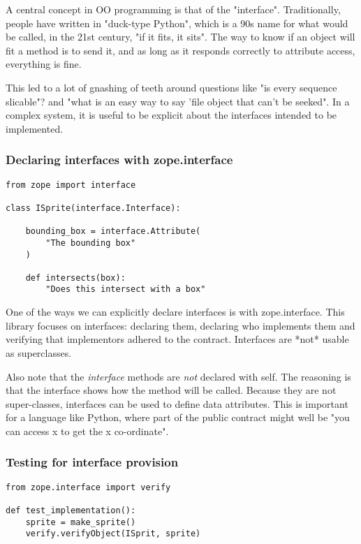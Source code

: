 A central concept in OO programming is that of the "interface".
Traditionally,
people have written in "duck-type Python",
which is a 90s name for what would be called,
in the 21st century,
"if it fits, it sits".
The way to know if an object will fit a method is to send it,
and as long as it responds correctly to attribute access,
everything is fine.

This led to a lot of gnashing of teeth around questions like
"is every sequence slicable"?
and
"what is an easy way to say 'file object that can't be seeked".
In a complex system,
it is useful to be explicit about the interfaces intended to be
implemented.

\begin{frame}[fragile]
\frametitle{Declaring interfaces with zope.interface}

\begin{lstlisting}
from zope import interface

class ISprite(interface.Interface):

    bounding_box = interface.Attribute(
        "The bounding box"
    )

    def intersects(box):
        "Does this intersect with a box"
\end{lstlisting}

\end{frame}

One of the ways we can explicitly declare interfaces is with
zope.interface.
This library focuses on interfaces:
declaring them,
declaring who implements them
and verifying that implementors adhered to the contract.
Interfaces are
*not*
usable as superclasses.

Also note that the {\em interface} methods
are {\em not} declared with self.
The reasoning is that the interface shows how the method
will be called.
Because they are not super-classes,
interfaces can be used to define data attributes.
This is important for a language like Python,
where part of the public contract might well be
"you can access x to get the x co-ordinate".

\begin{frame}[fragile]
\frametitle{Testing for interface provision}

\begin{lstlisting}
from zope.interface import verify

def test_implementation():
    sprite = make_sprite()
    verify.verifyObject(ISprit, sprite)
\end{lstlisting}

\end{frame}

